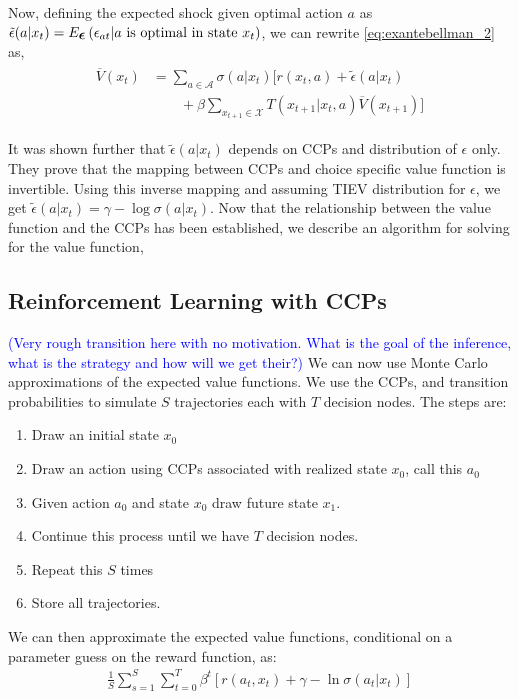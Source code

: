 \documentclass{article}
\renewcommand{\vec}[1]{\mbox{\bm{$#1$}}}
\begin{document}
Now, defining the expected shock given optimal action $a$ as $\tilde{\epsilon}(a|x_t) = E_{\vec{\epsilon}}\left( \epsilon_{at} |a\ \textrm{is optimal in state } x_t\right)$, we can rewrite \eqref{eq:exantebellman_2} as,
\begin{align} \label{eq:exantebellman_3}
\begin{split}
\overline{V}(x_t) & = \sum_{a\in\mathcal{A}} \sigma(a|x_t) \Big[r(x_t,a)+\tilde{\epsilon}(a|x_t) \\
& \qquad +\beta \sum_{x_{t+1}\in\mathcal{X}} T(x_{t+1}|x_t,a) \overline{V}(x_{t+1})\Big]
\end{split}
\end{align}

It was shown further that $\tilde{\epsilon}(a|x_t)$ depends on CCPs and distribution of $\epsilon$ only. They prove that the mapping between CCPs and choice specific value function is invertible. Using this inverse mapping and assuming TIEV distribution for $\epsilon$, we get $\tilde{\epsilon}(a|x_t) = \gamma - \log \sigma(a|x_t)$. Now that the relationship between the value function and the CCPs has been established, we describe an algorithm for solving for the value function,

\subsection{Reinforcement Learning with CCPs}

\textcolor{blue}{(Very rough transition here with no motivation. What is the goal of the inference, what is the strategy and how will we get their?)}
We can now use Monte Carlo approximations of the expected value functions. We use the CCPs, and transition probabilities to simulate $S$ trajectories each with $T$ decision nodes. The steps are:
\begin{enumerate}
\setlength{\itemsep}{0pt}
 \setlength{\parskip}{0pt}
    \item Draw an initial state $x_0$
    \item Draw an action using CCPs associated with realized state $x_0$, call this $a_0$
    \item Given action $a_0$ and state $x_0$ draw future state $x_1$. 
    \item Continue this process until we have $T$ decision nodes.
    \item Repeat this $S$ times
    \item Store all trajectories.
\end{enumerate}
We can then approximate the expected value functions, conditional on a parameter guess on the reward function, as:
\begin{eqnarray}
\frac{1}{S}\sum_{s=1}^S\sum_{t=0}^T\beta^t [r(a_t,x_t)+\gamma-\ln \sigma(a_t|x_t)]
\end{eqnarray}
\end{document}
